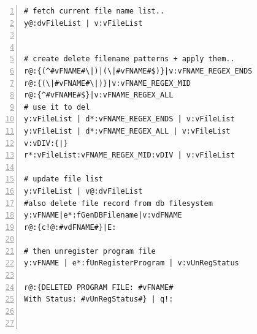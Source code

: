 \documentclass[a4paper, 18pt]{book} %
\begin{document}
{\begin{lstlisting}[style=tea,caption=TEA Program: TOS v1.1.0 Complete Source-Code (SANITIZED form), label=LST3,breaklines=true,numbers=left]
# fetch current file name list..
y@:dvFileList | v:vFileList


# create delete filename patterns + apply them..
r@:{(^#vFNAME#\|)|(\|#vFNAME#$)}|v:vFNAME_REGEX_ENDS
r@:{(\|#vFNAME#\|)}|v:vFNAME_REGEX_MID
r@:{^#vFNAME#$}|v:vFNAME_REGEX_ALL
# use it to del
y:vFileList | d*:vFNAME_REGEX_ENDS | v:vFileList
y:vFileList | d*:vFNAME_REGEX_ALL | v:vFileList
v:vDIV:{|}
r*:vFileList:vFNAME_REGEX_MID:vDIV | v:vFileList

# update file list 
y:vFileList | v@:dvFileList 
#also delete file record from db filesystem
y:vFNAME|e*:fGenDBFilename|v:vdFNAME
r@:{c!@:#vdFNAME#}|E:

# then unregister program file
y:vFNAME | e*:fUnRegisterProgram | v:vUnRegStatus

r@:{DELETED PROGRAM FILE: #vFNAME#
With Status: #vUnRegStatus#} | q!:



\end{lstlisting}}
\end{document}

